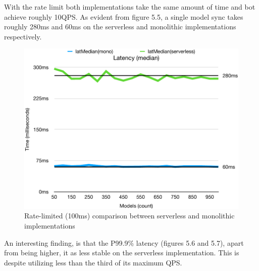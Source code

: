With the rate limit both implementations take the same amount of time and bot achieve roughly 10QPS.
As evident from figure 5.5, a single model sync takes roughly 280ms and 60ms on the serverless and monolithic implementations respectively.
\begin{figure}[h!]
    \centering
    \includegraphics[width=\textwidth]{media/rl100_lat_med.pdf}
    \caption{Rate-limited (100ms) comparison between serverless and monolithic implementations}
    \label{fig:rate_limited_comparison}
\end{figure}
An interesting finding, is that the P99.9\% latency (figures 5.6 and 5.7), apart from being higher, it as less stable on the serverless implementation. This is despite utilizing less than the third of its maximum QPS.
